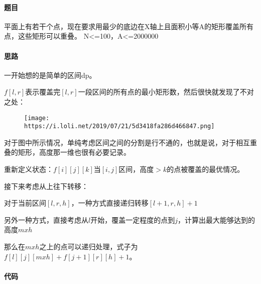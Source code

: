 \documentclass[
]{article}
\date{}
\begin{document}
\hypertarget{header-n0}{%
\paragraph{题目}\label{header-n0}}

平面上有若干个点，现在要求用最少的底边在X轴上且面积小等A的矩形覆盖所有点，这些矩形可以重叠。
N\textless=100，A\textless=2000000

\hypertarget{header-n4}{%
\paragraph{思路}\label{header-n4}}

一开始想的是简单的区间dp。

\(f[l,r]\)表示覆盖完\([l,r]\)一段区间的所有点的最小矩形数，然后很快就发现了不对之处：

\begin{figure}
\centering
\texttt{[image: https://i.loli.net/2019/07/21/5d3418fa286d466847.png]}
\caption{}
\end{figure}

对于图中所示情况，单纯考虑区间之间的分割是行不通的，也就是说，对于相互重叠的矩形，高度那一维也很有必要记录。

重新定义状态：\(f[i][j][k]\)当\([i,j]\)区间，高度\(>k\)的点被覆盖的最优情况。

接下来考虑从上往下转移：

对于当前区间\([l,r,h]\)，一种方式直接递归转移\([l+1,r,h]+1\)

另外一种方式，直接考虑从\(l\)开始，覆盖一定程度的点到\(j\)，计算出最大能够达到的高度\(mxh\)

那么在\(mxh\)之上的点可以递归处理，式子为\(f[l][j][mxh]+f[j+1][r][h]+1\)。

\hypertarget{header-n14}{%
\paragraph{代码}\label{header-n14}}
\end{document}
